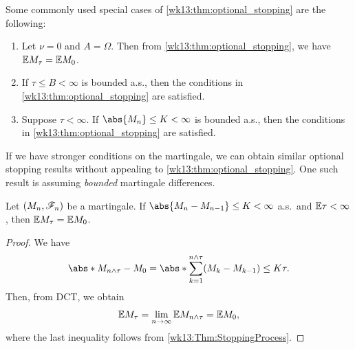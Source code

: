 \documentclass[12pt]{article}
\begin{document}
%
Some commonly used special cases of \cref{wk13:thm:optional_stopping} are the following:
\begin{enumerate}
\item Let $\nu=0$ and  $A = \Omega$. Then from \cref{wk13:thm:optional_stopping}, we have  $\E M_\tau = \E M_0$.
\item If $\tau \leq B < \infty$ is bounded a.s., then the conditions in \cref{wk13:thm:optional_stopping} are satisfied.
\item Suppose $\tau <\infty$. If $\abs{M_n} \leq K < \infty$ is bounded a.s., then the conditions in \cref{wk13:thm:optional_stopping} are satisfied.
\end{enumerate}

If we have stronger conditions on the martingale, we can obtain similar optional stopping results without appealing to \cref{wk13:thm:optional_stopping}. One such result is assuming \emph{bounded} martingale differences. 
\begin{Lemma}\label{wk13:lem:M_bdd_diff}
Let $(M_n, \mathscr{F}_n)$ be a martingale. If $\abs{M_n - M_{n-1}} \leq K <\infty$ a.s.\ and $\E \tau < \infty$, then $\E M_\tau = \E M_0$. 
\end{Lemma}
\begin{proof}
We have
\begin{align*}
\abs*{M_{n \wedge \tau} - M_0} = \abs*{\sum_{k=1}^{n \wedge \tau} (M_k - M_{k-1})} \leq K\tau.
\end{align*}
Then, from DCT, we obtain
\begin{align*}
\E M_\tau = \lim_{n \to \infty} \E M_{n \wedge \tau} = \E M_0,
\end{align*}
where the last inequality follows from \cref{wk13:Thm:StoppingProcess}.
\end{proof}
%
\end{document}
